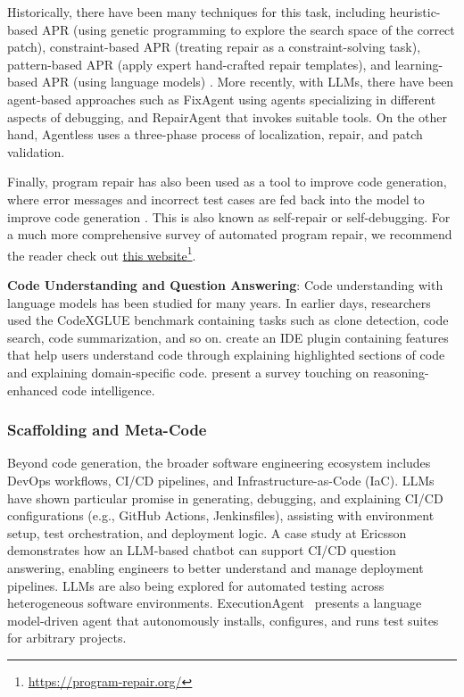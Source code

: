 Historically, there have been many techniques for this task, including heuristic-based APR (using genetic programming to explore the search space of the correct patch), constraint-based APR (treating repair as a constraint-solving task), pattern-based APR (apply expert hand-crafted repair templates), and learning-based APR (using language models) \citep{zhang2024systematic}.
More recently, with LLMs, there have been agent-based approaches such as FixAgent \citep{lee2024unified} using agents specializing in different aspects of debugging, and RepairAgent \citep{bouzenia2024repairagent} that invokes suitable tools. On the other hand, Agentless \citep{xia2024agentless} uses a three-phase process of localization, repair, and patch validation. 

Finally, program repair has also been used as a tool to improve code generation, where error messages and incorrect test cases are fed back into the model to improve code generation \citep{madaan2023self, chen2024teaching, zhang2023self, olausson2024repair, zhong2024debug, tang2025code}. This is also known as self-repair or self-debugging. 
For a much more comprehensive survey of automated program repair, we recommend the reader check out \href{https://program-repair.org/}{this website}\footnote{\url{https://program-repair.org/}}.


\textbf{Code Understanding and Question Answering}: Code understanding with language models has been studied for many years. In earlier days, researchers used the CodeXGLUE \citep{lu2021codexglue} benchmark containing tasks such as clone detection, code search, code summarization, and so on. \citet{nam2024using} create an IDE plugin containing features that help users understand code through explaining highlighted sections of code and explaining domain-specific code. \citet{yang2025code} present a survey touching on reasoning-enhanced code intelligence.


\subsubsection{Scaffolding and Meta-Code}
Beyond code generation, the broader software engineering ecosystem includes DevOps workflows, CI/CD pipelines, and Infrastructure-as-Code (IaC). 
LLMs have shown particular promise in generating, debugging, and explaining CI/CD configurations (e.g., GitHub Actions, Jenkinsfiles), assisting with environment setup, test orchestration, and deployment logic. 
A case study at Ericsson~\citep{chaudhary2024developing} demonstrates how an LLM-based chatbot can support CI/CD question answering, enabling engineers to better understand and manage deployment pipelines.
LLMs are also being explored for automated testing across heterogeneous software environments. 
ExecutionAgent~\citep{bouzenia2024itirunit} presents a language model-driven agent that autonomously installs, configures, and runs test suites for arbitrary projects.

